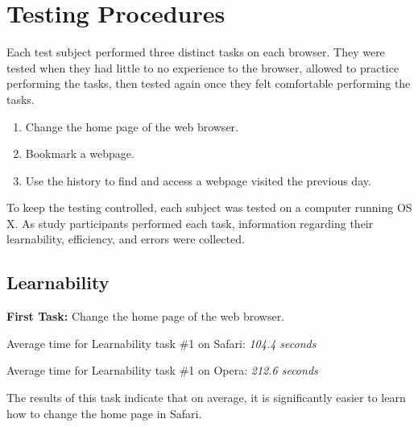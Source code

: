 \documentclass{article}
\begin{document}
\section{Testing Procedures} Each test subject performed three distinct tasks on each browser. They were tested when they had little to no experience to the browser, allowed to practice performing the tasks, then tested again once they felt comfortable performing the tasks.
\begin{enumerate}
	\item Change the home page of the web browser.
	\item Bookmark a webpage.
	\item Use the history to find and access a webpage visited the previous day.
\end{enumerate}
To keep the testing controlled, each subject was tested on a computer running OS X. As study participants performed each task, information regarding their learnability, efficiency, and errors were collected.

\subsection{Learnability}
\par
\textbf{First Task: } Change the home page of the web browser.
\begin{center}

\par Average time for Learnability task \#1 on Safari: \textit{104.4 seconds}
\par Average time for Learnability task \#1 on Opera: \textit{212.6 seconds}
\end{center}
\par \noindent The results of this task indicate that on average, it is significantly easier to learn how to change the home page in Safari.
\end{document}
